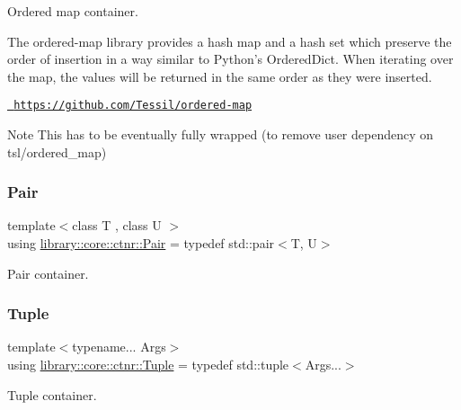 Ordered map container. 

\begin{DoxyVerb}                        The ordered-map library provides a hash map and a hash set which preserve the order of insertion
                        in a way similar to Python's OrderedDict.
                        When iterating over the map, the values will be returned in the same order as they were inserted.
\end{DoxyVerb}


\href{https://github.com/Tessil/ordered-map}{\texttt{ https\+://github.\+com/\+Tessil/ordered-\/map}} \begin{DoxyNote}{Note}
This has to be eventually fully wrapped (to remove user dependency on tsl/ordered\+\_\+map) 
\end{DoxyNote}
\mbox{\label{namespacelibrary_1_1core_1_1ctnr_aad6f8de4c0f279c10436d59d4ace74bd}} 
\subsubsection{\texorpdfstring{Pair}{Pair}}
{\footnotesize\ttfamily template$<$class T , class U $>$ \\
using \mbox{\hyperlink{namespacelibrary_1_1core_1_1ctnr_aad6f8de4c0f279c10436d59d4ace74bd}{library\+::core\+::ctnr\+::\+Pair}} = typedef std\+::pair$<$T, U$>$}



Pair container. 

\mbox{\label{namespacelibrary_1_1core_1_1ctnr_a551ef72e2adb570c4d6bdf5e1bbc96b9}} 
\subsubsection{\texorpdfstring{Tuple}{Tuple}}
{\footnotesize\ttfamily template$<$typename... Args$>$ \\
using \mbox{\hyperlink{namespacelibrary_1_1core_1_1ctnr_a551ef72e2adb570c4d6bdf5e1bbc96b9}{library\+::core\+::ctnr\+::\+Tuple}} = typedef std\+::tuple$<$Args...$>$}



Tuple container. 



